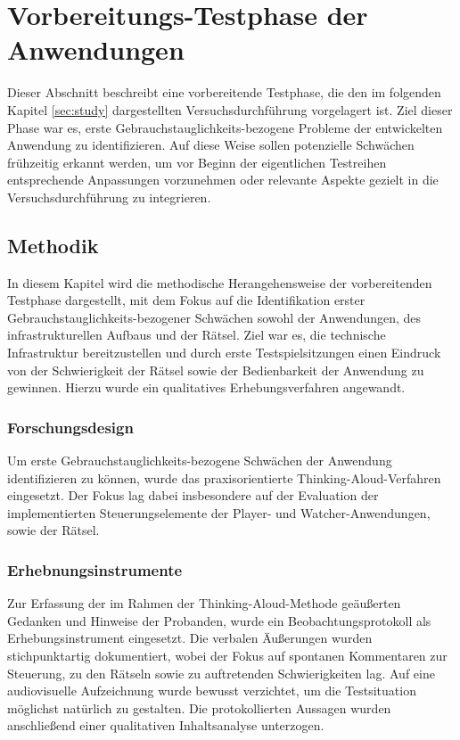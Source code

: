 \chapter{Vorbereitungs-Testphase der Anwendungen}\label{sec:pre-study}

Dieser Abschnitt beschreibt eine vorbereitende Testphase, die den im folgenden Kapitel \ref{sec:study} dargestellten Versuchsdurchführung vorgelagert ist. Ziel dieser Phase war es, erste Gebrauchstauglichkeits-bezogene Probleme der entwickelten Anwendung zu identifizieren. Auf diese Weise sollen potenzielle Schwächen frühzeitig erkannt werden, um vor Beginn der eigentlichen Testreihen entsprechende Anpassungen vorzunehmen oder relevante Aspekte gezielt in die Versuchsdurchführung zu integrieren.

\section{Methodik}
In diesem Kapitel wird die methodische Herangehensweise der vorbereitenden Testphase dargestellt, mit dem Fokus auf die Identifikation erster Gebrauchstauglichkeits-bezogener Schwächen sowohl der Anwendungen, des infrastrukturellen Aufbaus und der Rätsel. Ziel war es, die technische Infrastruktur bereitzustellen und durch erste Testspielsitzungen einen Eindruck von der Schwierigkeit der Rätsel sowie der Bedienbarkeit der Anwendung zu gewinnen. Hierzu wurde ein qualitatives Erhebungsverfahren angewandt.

\subsection{Forschungsdesign}

Um erste Gebrauchstauglichkeits-bezogene Schwächen der Anwendung identifizieren zu können, wurde das praxisorientierte Thinking-Aloud-Verfahren eingesetzt. Der Fokus lag dabei insbesondere auf der Evaluation der implementierten Steuerungselemente der Player- und Watcher-Anwendungen, sowie der Rätsel.

\subsection{Erhebnungsinstrumente}

Zur Erfassung der im Rahmen der Thinking-Aloud-Methode geäußerten Gedanken und Hinweise der Probanden, wurde ein Beobachtungsprotokoll als Erhebungsinstrument eingesetzt. Die verbalen Äußerungen wurden stichpunktartig dokumentiert, wobei der Fokus auf spontanen Kommentaren zur Steuerung, zu den Rätseln sowie zu auftretenden Schwierigkeiten lag. Auf eine audiovisuelle Aufzeichnung wurde bewusst verzichtet, um die Testsituation möglichst natürlich zu gestalten. Die protokollierten Aussagen wurden anschließend einer qualitativen Inhaltsanalyse unterzogen.

